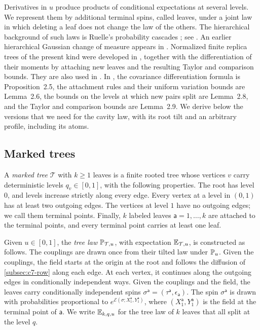 Derivatives in $u$ produce products of conditional expectations at
several levels. We represent them by additional terminal spins, called
leaves, under a joint law in which deleting a leaf does not change the
law of the others. The hierarchical background of such laws is Ruelle's
probability cascades \cite{Ruelle1987}; see
\cite[Chapter~2]{Panchenko2013Book}. An earlier hierarchical Gaussian
change of measure appears in
\cite[Theorem~4.3, (4.25)--(4.26)]{BolthausenSznitman1998}. Normalized
finite replica trees of the present kind were developed in
\cite[Section~2]{OpenAIFluctuationScale}, together with the
differentiation of their moments by attaching new leaves and the
resulting Taylor and comparison bounds. They are also used in
\cite[Sections~2.1--2.3]{OpenAILimitingLaw}. In
\cite{OpenAIFluctuationScale}, the covariance differentiation formula is
Proposition~2.5, the attachment rules and their uniform variation bounds
are Lemma~2.6, the bounds on the levels at which new pairs split are
Lemma~2.8, and the Taylor and comparison bounds are Lemma~2.9. We derive
below the versions that we need for the cavity law, with its root tilt
and an arbitrary profile, including its atoms.

\subsection{Marked trees}

\begin{definition}\label{def:tree-marked}
A \emph{marked tree} $\mathcal T$ with $k\ge1$ leaves is a finite rooted
tree whose vertices $v$ carry deterministic levels $q_v\in[0,1]$, with
the following properties. The root has level $0$, and levels increase
strictly along every edge. Every vertex at a level in $(0,1)$ has at
least two outgoing edges. The vertices at level $1$ have no outgoing
edges; we call them terminal points. Finally, $k$ labeled leaves
$\mathsf a=1,\ldots,k$ are attached to the terminal points, and every
terminal point carries at least one leaf.

Given $u\in[0,1]$, the \emph{tree law} $\mathbb P_{\mathcal T,u}$, with
expectation $\mathbb E_{\mathcal T,u}$, is constructed as follows. The couplings
are drawn once from their tilted law under $\mathbb P_u$. Given the couplings,
the field starts at the origin at the root and follows the diffusion of
\cref{subsec:c7-row} along each edge. At each vertex, it continues along
the outgoing edges in conditionally independent ways. Given the couplings
and the field, the leaves carry conditionally independent spins
$\sigma^{\mathsf a}=(\tau^{\mathsf a},\epsilon_{\mathsf a})$. The spin
$\sigma^{\mathsf a}$ is drawn with probabilities proportional to
$e^{\mathcal E(\sigma;X^{\mathsf a}_1,Y^{\mathsf a}_1)}$, where
$(X^{\mathsf a}_1,Y^{\mathsf a}_1)$ is the field at the terminal point of
$\mathsf a$. We write $\mathbb E_{k,q,u}$ for the tree law of $k$ leaves that
all split at the level $q$.
\end{definition}

